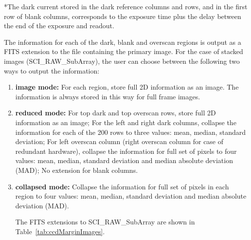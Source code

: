 \documentclass[11pt]{article}      %
\begin{document}
*The dark current stored in the dark reference columns and rows, and in the first row of blank columns, corresponds to the exposure time plus the delay between the end of the exposure and readout.

The information for each of the dark, blank and overscan regions is output as a FITS extension to the file containing the primary image. For the case of stacked images (SCI\_RAW\_SubArray), the user can choose between the following two ways to output the information:

\begin{enumerate}
\item {\bf image mode:} For each region, store full 2D information as an image. The information is always stored in this way for full frame images.
\item {\bf reduced mode:} For top dark and top overscan rows, store full 2D information as an image; For the left and right dark columns, collapse the information for each of the 200 rows to three values: mean, median, standard deviation; For left overscan column (right overscan column for case of redundant hardware), collapse the information for full set of pixels to four values: mean, median, standard deviation and median absolute deviation (MAD); No extension for blank columns.
\item {\bf collapsed mode:} Collapse the information for full set of pixels in each region to four values: mean, median, standard deviation and median absolute deviation (MAD).

The FITS extensions to SCI\_RAW\_SubArray are shown in Table~\ref{tab:ccdMarginImages}.

\end{enumerate}
\end{document}

